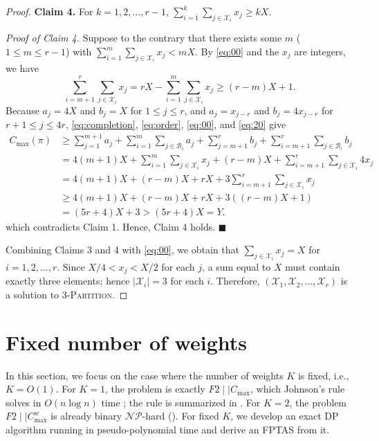 ﻿\documentclass[12pt]{article} \textheight=24.5cm \textwidth=16.5cm \parskip = 0.165cm
\let\origsection\section
\renewcommand{\section}{\FloatBarrier\origsection}
\begin{document}
\begin{sloppypar}
\begin{proof}
        \textbf{Claim 4.} For $k=1, 2, \ldots, r-1$, $\sum_{i=1}^k \sum_{j \in \mathcal{X}_i} x_j \geq kX$.

        \textit{Proof of Claim 4.} Suppose to the contrary that there exists some $m$ ($1 \leq m \leq r-1$) with $\sum_{i=1}^m \sum_{j \in \mathcal{X}_i} x_j < mX$.
        By \cref{eq:00} and the $x_j$ are integers, we have
            \begin{equation}\label{eq:20}
                \sum_{i=m+1}^r \sum_{j \in \mathcal{X}_i} x_j=rX-\sum_{i=1}^m \sum_{j \in \mathcal{X}_i} x_j \geq (r-m)X+1.
            \end{equation}
        Because $a_j=4X$ and $b_j=X$ for $1 \leq j \leq r$, and $a_j=x_{j-r}$ and $b_j=4 x_{j-r}$ for $r+1 \leq j \leq 4r$, \cref{eq:completion}, \cref{eq:order}, \cref{eq:00}, and \cref{eq:20} give
            \begin{align*}
                C_{\max}(\pi) & \geq \sum_{j=1}^{m+1} a_j+\sum_{i=1}^m \sum_{j \in \mathcal{B}_i} a_j+\sum_{j=m+1}^r      b_j+\sum_{i=m+1}^r \sum_{j \in \mathcal{B}_i} b_j  \nonumber \\
                &= 4(m+1)X+\sum_{i=1}^m \sum_{j \in \mathcal{X}_i} x_j +(r-m)X +\sum_{i=m+1}^r \sum_{j \in \mathcal{X}_i} 4 x_j \nonumber \\
                &= 4(m+1)X +(r-m)X + rX+ 3 \sum_{i=m+1}^r \sum_{j \in \mathcal{X}_i} x_j \\
                & \geq 4(m+1)X +(r-m)X + rX+ 3((r-m)X+1)  \nonumber \\
                & = (5r+4)X +3 > (5r+4)X = Y. \nonumber
            \end{align*}
        which contradicts Claim 1.
        Hence, Claim 4 holds.
        \hfill$\blacksquare$

        Combining Claims 3 and 4 with \cref{eq:00}, we obtain that $\sum_{j \in \mathcal{X}_i} x_j=X$ for $i=1, 2, \ldots, r$.
        Since $X/4 < x_j < X/2$ for each $j$, a sum equal to $X$ must contain exactly three elements; hence  $|\mathcal{X}_i|=3$ for each $i$.
        Therefore, $(\mathcal{X}_1, \mathcal{X}_2, \ldots, \mathcal{X}_r)$ is a solution to 3-\textsc{Partition}.
        \end{proof}

        \section{Fixed number of weights} \label{sec:dp_algorithm}

        In this section, we focus on the case where the number of weights $K$ is fixed, i.e., $K=O(1)$.
        For $K=1$, the problem is exactly $F2 \mid \mid C_{\max}$, which Johnson's rule solves in $O(n \log n)$ time \citep{Johnson1954NRL}; the rule is summarized in .
        For $K=2$, the problem $F2 \mid \mid C_{\max}^w$ is already binary $\mathcal{NP}$-hard ().
        For fixed $K$, we develop an exact DP algorithm running in pseudo-polynomial time and derive an FPTAS from it.


\end{sloppypar}
\end{document}
